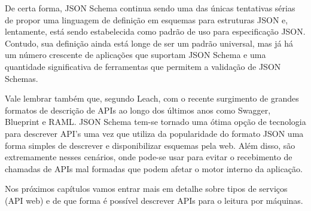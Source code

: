 De certa forma, JSON Schema continua sendo uma das únicas tentativas sérias de propor uma linguagem de definição em esquemas para estruturas JSON e, lentamente, está sendo estabelecida como padrão de uso para especificação JSON. Contudo, sua definição ainda está longe de ser um padrão universal, mas já há um número crescente de aplicações que suportam JSON Schema e uma quantidade significativa de ferramentas que permitem a validação de JSON Schemas. \cite{PezoaEtAl2016}

Vale lembrar também que, segundo Leach, com o recente surgimento de grandes formatos de descrição de APIs ao longo dos últimos anos como Swagger, Blueprint e RAML. JSON Schema tem-se tornado uma ótima opção de tecnologia para descrever API's uma vez que utiliza da popularidade do formato JSON uma forma simples de descrever e disponibilizar esquemas pela web. Além disso, são extremamente nesses cenários, onde pode-se usar para evitar o recebimento de chamadas de APIs mal formadas que podem afetar o motor interno da aplicação. \cite{Leach2014} \cite{PezoaEtAl2016}

Nos próximos capítulos vamos entrar mais em detalhe sobre tipos de serviços (API web) e de que forma é possível descrever APIs para o leitura por máquinas.
